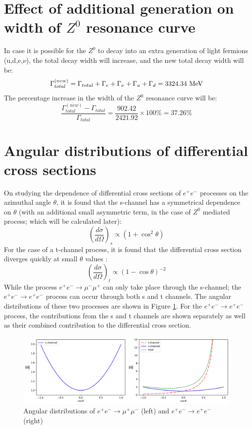 \section{Effect of additional generation on width of $Z^{0}$ resonance curve}
In case it is possible for the $Z^{0}$ to decay into an extra generation of light fermions (u,d,e,$\nu$), the total decay width will increase, and the new total decay width will be: $$\Gamma_{total}^{(new)}=\Gamma_{total}+\Gamma_{e}+\Gamma_{\nu}+\Gamma_{u}+\Gamma_{d}=3324.34 \ \rm{MeV}$$
The percentage increase in the width of the $Z^{0}$ resonance curve will be: $$\dfrac{\Gamma_{total}^{(new)}-\Gamma_{total}}{\Gamma_{total}}=\dfrac{902.42}{2421.92}\times 100 \% = 37.26 \%$$

\section{Angular distributions of differential cross sections}
On studying the dependence of differential cross sections of $e^{+}e^{-}$ processes on the azimuthal angle $\theta$, it is found that the s-channel has a symmetrical dependence on $\theta$ (with an additional small asymmetric term, in the case of $Z^{0}$ mediated process; which will be calculated later): 
\begin{equation}
\left(\dfrac{d\sigma}{d\Omega}\right)_{s}\propto \left(1+\cos^{2}\theta\right)
\end{equation} 
For the case of a t-channel process, it is found that the differential cross section diverges quickly at small $\theta$ values \cite{UB}:
\begin{equation}
\left(\dfrac{d\sigma}{d\Omega}\right)_{t}\propto \left(1-\cos\theta\right)^{-2}
\end{equation}
While the process $e^{+}e^{-}\rightarrow \mu^{-}\mu^{+}$ can only take place through the s-channel; the $e^{+}e^{-}\rightarrow e^{+}e^{-}$ process can occur through both s and t channels. The angular distributions of these two processes are shown in Figure \ref{angdist}. For the $e^{+}e^{-}\rightarrow e^{+}e^{-}$ process, the contributions from the s and t channels are shown separately as well as their combined contribution to the differential cross section.
\begin{figure}[h]
\includegraphics[width=\textwidth]{angulardist.pdf}
\caption[Angular distributions of $e^{+}e^{-}\rightarrow \mu^{+}\mu^{-}$ and $e^{+}e^{-}\rightarrow e^{+}e^{-}$]{Angular distributions of $e^{+}e^{-}\rightarrow \mu^{+}\mu^{-}$ (left) and $e^{+}e^{-}\rightarrow e^{+}e^{-}$ (right)}
\label{angdist}
\end{figure}

